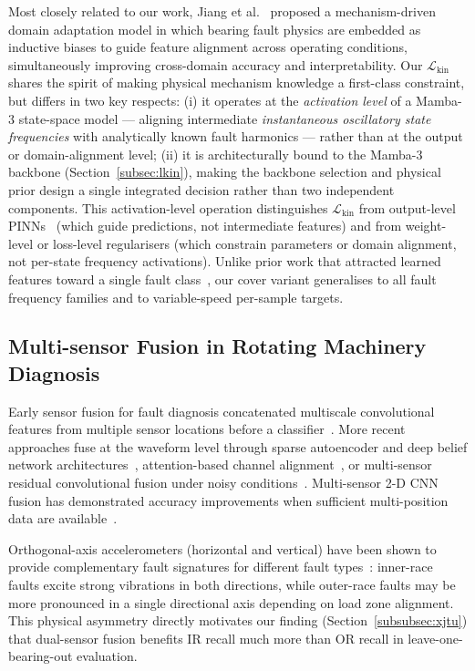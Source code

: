 Most closely related to our work, Jiang et al.~\cite{jiang2025mechanism}
proposed a mechanism-driven domain adaptation model in which bearing
fault physics are embedded as inductive biases to guide feature alignment
across operating conditions, simultaneously improving cross-domain accuracy
and interpretability.
Our $\mathcal{L}_{\text{kin}}$ shares the spirit of making physical
mechanism knowledge a first-class constraint, but differs in two key
respects: (i) it operates at the \emph{activation level} of a Mamba-3
state-space model — aligning intermediate \emph{instantaneous oscillatory
state frequencies} with analytically known fault harmonics — rather than
at the output or domain-alignment level; (ii) it is architecturally
bound to the Mamba-3 backbone (Section~\ref{subsec:lkin}), making
the backbone selection and physical prior design a single integrated
decision rather than two independent components.
This activation-level operation distinguishes $\mathcal{L}_{\text{kin}}$
from output-level PINNs~\cite{raissi2019physics,willard2022physics}
(which guide predictions, not intermediate features) and from weight-level
or loss-level regularisers (which constrain parameters or domain alignment,
not per-state frequency activations).
Unlike prior work that attracted learned features toward a single fault
class~\cite{lu2017hierarchical}, our cover variant generalises to all
fault frequency families and to variable-speed per-sample targets.

\subsection{Multi-sensor Fusion in Rotating Machinery Diagnosis}
\label{subsec:rel_multisensor}

Early sensor fusion for fault diagnosis concatenated multiscale convolutional
features from multiple sensor locations before a
classifier~\cite{fusion_early,multisensor_encoder}.
More recent approaches fuse at the waveform level through sparse autoencoder
and deep belief network architectures~\cite{chen2017multisensor,wang2020vibro},
attention-based channel alignment~\cite{wan2023multisensor,multisensor_attn},
or multi-sensor residual convolutional fusion under noisy
conditions~\cite{ye2024mrcfn}.
Multi-sensor 2-D CNN fusion has demonstrated accuracy improvements when
sufficient multi-position data are available~\cite{wang2021multisensor2d}.

Orthogonal-axis accelerometers (horizontal and vertical) have been shown
to provide complementary fault signatures for different fault
types~\cite{xjtu_paper}: inner-race faults excite strong vibrations in both
directions, while outer-race faults may be more pronounced in a single
directional axis depending on load zone alignment.
This physical asymmetry directly motivates our finding
(Section~\ref{subsubsec:xjtu}) that dual-sensor fusion benefits IR recall
much more than OR recall in leave-one-bearing-out evaluation.

